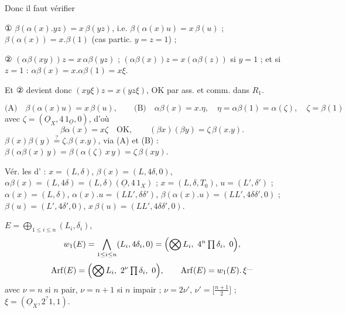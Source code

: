 \documentclass[11pt,a4paper]{article}
\begin{document}
Donc il faut vérifier

① $\beta(\alpha(x).yz) = x\,\beta(yz)$, i.e. $\beta(\alpha(x)u) = x\,\beta(u)$ ; $\beta(\alpha(x)) = x.\beta(1)$ (cas partic. $y = z = 1$) ;

② $(\alpha\beta(xy))z = x\,\alpha\beta(yz)$ ; $(\alpha\beta(x))z = x(\alpha\beta(z))$ si $y = 1$ ; et si $z = 1$ : $\alpha\beta(x) = x.\alpha\beta(1) = x\xi$.

Et ② devient donc $(xy\xi)z = x(yz\xi)$, OK par ass. et comm. dans $R_1$.

\[
  \text{(A)}\quad \beta(\alpha(x)u) = x\,\beta(u), \qquad
  \text{(B)}\quad \alpha\beta(x) = x.\eta, \quad \eta = \alpha\beta(1) = \alpha(\zeta), \quad \zeta = \beta(1)
\]
avec $\zeta = (\underline{O}_X, 4\,1_{\underline{O}}, 0)$, d'où
\[
  \beta\alpha(x) = x\zeta \quad \text{OK}, \qquad (\beta x)(\beta y) = \zeta\, \beta(x.y).
\]
 \quad $\beta(x)\beta(y) \overset{?}{=} \zeta . \beta(x.y)$, via (A) et (B) : $\beta(\alpha\beta(x)\,y) = \beta(\alpha(\zeta)\,x\,y) = \zeta\,\beta(xy)$.

Vér. les \ill{} d' : $x = (L, \delta)$, $\beta(x) = (L, 4\delta, 0)$, $\alpha\beta(x) = (L, 4\delta) = (L,\delta)(\underline{O}, 4\,1_X)$ ;
$x = (L, \delta, T_0)$, $u = (L', \delta')$ ; $\alpha(x) = (L, \delta)$, $\alpha(x).u = (LL', \delta\delta')$, $\beta(\alpha(x).u) = (LL', 4\delta\delta', 0)$ ;
$\beta(u) = (L', 4\delta', 0)$, $x\,\beta(u) = (LL', 4\delta\delta', 0)$.


$E = \bigoplus_{1 \le i \le n} (L_i, \delta_i)$,
\[
  w_1(E) = \bigwedge_{1 \le i \le n} (L_i, 4\delta_i, 0) = \Bigl(\bigotimes L_i,\ 4^{n} \textstyle\prod \delta_i,\ 0\Bigr),
\]
\[
  \mathrm{Arf}(E) = \Bigl(\bigotimes L_i,\ 2^{\nu} \textstyle\prod \delta_i,\ 0\Bigr),
  \qquad \mathrm{Arf}(E) = w_1(E).\,\xi^{\ldots}
\]
avec $\nu = n$ si $n$ pair, $\nu = n+1$ si $n$ impair ; $\nu = 2\nu'$, $\nu' = \bigl[\tfrac{n+1}{2}\bigr]$ ; $\xi = (\underline{O}_X, 2^{?}1, 1)$.
\end{document}
